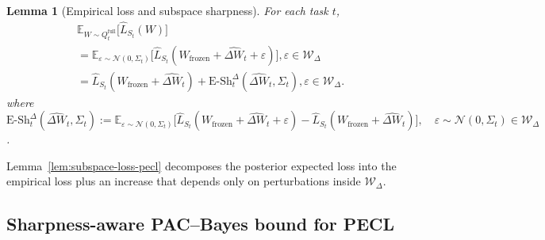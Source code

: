 \documentclass{article}
\theoremstyle{plain}
\newtheorem{lemma}[theorem]{Lemma}
\theoremstyle{definition}
\theoremstyle{remark}
\begin{document}
\begin{lemma}[Empirical loss and subspace sharpness]
\label{lem:subspace-loss-pecl}
For each task $t$,
\begin{equation*}
\label{eq:subspace-loss-pecl}
\begin{aligned}
&\mathbb E_{W\sim Q_t^{\mathrm{full}}}\bigl[\hat L_{S_t}(W)\bigr] \\
&= \mathbb{E}_{\varepsilon\sim\mathcal N(0,\Sigma_t)}
    \big[\hat{L}_{S_t}(W_\mathrm {frozen }+\hat{\Delta W}_t+\varepsilon)\big],\varepsilon\in\mathcal W_\Delta \\
& =\hat L_{S_t}(W_{\mathrm{frozen}} + \hat{\Delta W}_t)
+
\mathrm{E\text{-}Sh}_t^\Delta(\hat{\Delta W}_t,\Sigma_t),\varepsilon\in\mathcal W_\Delta.
\end{aligned}
\end{equation*}
where $
\mathrm{E\text{-}Sh}_t^{\Delta}(\hat{\Delta W}_t,\Sigma_t)
:= \mathbb{E}_{\varepsilon\sim\mathcal N(0,\Sigma_t)}
   \big[\hat{L}_{S_t}(W_\mathrm {frozen }+\hat{\Delta W}_t+\varepsilon)
       - \hat{L}_{S_t}(W_\mathrm {frozen }+\hat{\Delta W}_t)\big],\quad
\varepsilon\sim\mathcal N(0,\Sigma_t) \in  \mathcal W_\Delta$.
\end{lemma}
Lemma~\eqref{lem:subspace-loss-pecl} decomposes the posterior expected loss into the empirical loss plus an increase that depends only on perturbations inside $\mathcal W_\Delta$. 





\subsection{Sharpness-aware PAC–Bayes bound for PECL}
\label{sec:pecl-bound-main}
\end{document}
